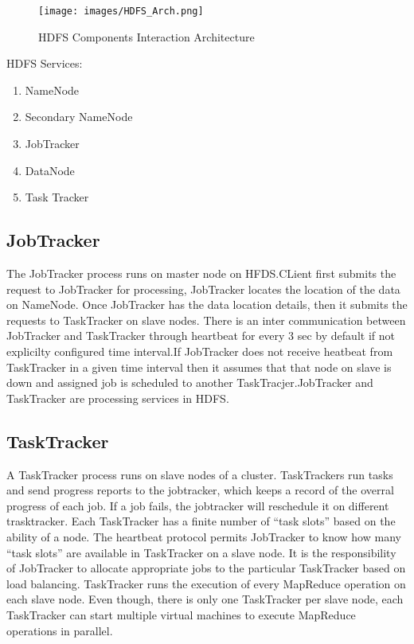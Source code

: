 \begin{figure}[!ht]
\centering\texttt{[image: images/HDFS\_Arch.png]}
  \caption{HDFS Components Interaction Architecture}\label{f:hdfs-arch}
\end{figure}

HDFS Services:

\begin{enumerate}
	\item NameNode
	\item Secondary NameNode
	\item JobTracker
	\item DataNode
	\item Task Tracker
\end {enumerate}

\subsection{JobTracker}

The JobTracker process runs on master node on HFDS.CLient 
first submits the request to JobTracker for processing,
JobTracker locates the location of the data on NameNode. 
Once JobTracker has the data location details, then it submits 
the requests to TaskTracker on slave nodes. There is an inter communication 
between JobTracker and TaskTracker through heartbeat for every 3 sec 
by default if not explicilty configured time interval.If JobTracker 
does not receive heatbeat from TaskTracker in a given time interval then 
it assumes that that node on slave is down and assigned
job is scheduled to another TaskTracjer.JobTracker and 
TaskTracker are processing services in HDFS.

\subsection{TaskTracker}

A TaskTracker process runs on slave nodes of a cluster. 
TaskTrackers run tasks and send progress reports to the jobtracker,
which keeps a record of the overral progress of each job.
If a job fails, the jobtracker will reschedule it on different trasktracker.
Each TaskTracker has a finite number of “task slots” based on the 
ability of a node. The heartbeat protocol permits JobTracker to know 
how many “task slots” are available in TaskTracker on a slave node.
It is the responsibility of JobTracker to allocate appropriate jobs to the 
particular TaskTracker based on load balancing. 
TaskTracker runs the execution of every MapReduce 
operation on each slave node. Even though, there is only one 
TaskTracker per slave node, each TaskTracker can start 
multiple virtual machines to execute MapReduce operations in parallel. 


